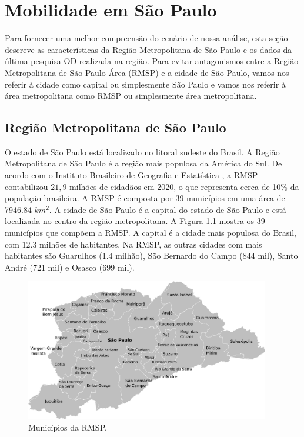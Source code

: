 \chapter{Mobilidade em São Paulo}
\label{cap:mobilidade-rmsp}

Para fornecer uma melhor compreensão do cenário de nossa análise, esta seção
descreve as características da Região Metropolitana de S\~ao Paulo e os dados da
última pesquisa OD realizada na região. Para evitar antagonismos entre a
Região Metropolitana de S\~ao Paulo Área (RMSP) e a cidade de S\~ao Paulo, vamos nos
referir à cidade como capital ou simplesmente S\~ao Paulo e vamos nos referir à
área metropolitana como RMSP ou simplesmente área metropolitana. 

\section{Região Metropolitana de São Paulo}

O estado de S\~ao Paulo está localizado no litoral sudeste do Brasil. A Regi\~ao
Metropolitana de S\~ao Paulo é a região mais populosa da América do Sul. De acordo
com o Instituto Brasileiro de Geografia e Estatística \citep{ibge2020}, a RMSP contabilizou $21,9$
milhões de cidadãos em 2020, o que representa cerca de 10\% da população
brasileira. A RMSP é composta por 39 municípios em uma área de \num{7946.84} $km^{2}$. A
cidade de São Paulo é a capital do estado de São Paulo e está localizada no
centro da região metropolitana. A Figura \ref{fig:map-spma} mostra os 39 municípios que compõem a
RMSP. A capital é a cidade mais populosa do Brasil, com 12.3 milhões de
habitantes. Na RMSP, as outras cidades com mais habitantes são Guarulhos (1.4
milhão), São Bernardo do Campo (844 mil), Santo André (721 mil) e Osasco (699
mil).

\begin{figure}[!htb]
  \centering
  \captionsetup{justification=centering}
  \includegraphics[width=0.95\textwidth]{../figuras/map-spma.png}
    \caption{Municípios da RMSP.\label{fig:map-spma}}
\end{figure}

